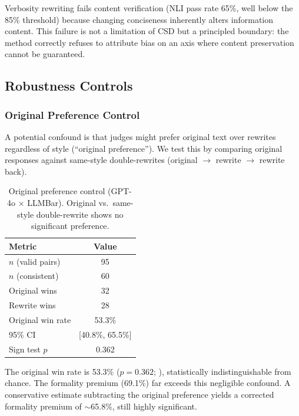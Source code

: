 \documentclass[11pt,a4paper]{article}
\begin{document}
Verbosity rewriting fails content verification (NLI pass rate 65\%, well below the 85\% threshold) because changing conciseness inherently alters information content.
This failure is not a limitation of CSD but a principled boundary: the method correctly refuses to attribute bias on an axis where content preservation cannot be guaranteed.

\subsection{Robustness Controls}

\subsubsection{Original Preference Control}
\label{sec:origpref}

A potential confound is that judges might prefer original text over rewrites regardless of style (``original preference'').
We test this by comparing original responses against same-style double-rewrites (original $\to$ rewrite $\to$ rewrite back).

\begin{table}[t]
\centering
\small
\caption{Original preference control (GPT-4o $\times$ LLMBar). Original vs.\ same-style double-rewrite shows no significant preference.}
\label{tab:origpref}
\begin{tabular}{lc}
\toprule
\textbf{Metric} & \textbf{Value} \\
\midrule
$n$ (valid pairs)     & 95 \\
$n$ (consistent)      & 60 \\
Original wins         & 32 \\
Rewrite wins          & 28 \\
Original win rate     & 53.3\% \\
95\% CI               & [40.8\%, 65.5\%] \\
Sign test $p$         & 0.362 \\
\bottomrule
\end{tabular}
\end{table}

The original win rate is 53.3\% ($p = 0.362$; ), statistically indistinguishable from chance.
The formality premium (69.1\%) far exceeds this negligible confound.
A conservative estimate subtracting the original preference yields a corrected formality premium of $\sim$65.8\%, still highly significant.
\end{document}
